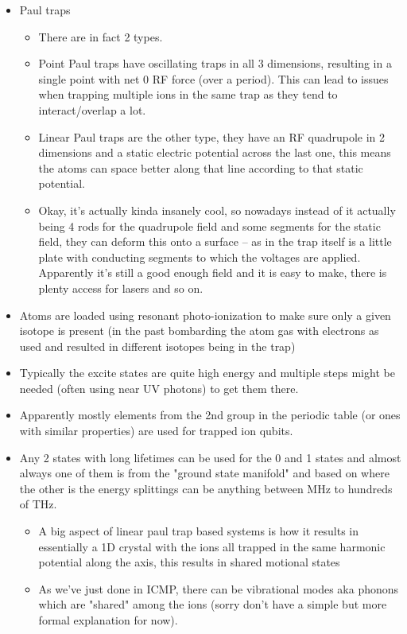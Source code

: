 \begin{itemize}
\begin{itemize}
    \item Paul traps
    \begin{itemize}
        \item There are in fact 2 types.
        \item Point Paul traps have oscillating traps in all 3 dimensions, resulting in a single point with net 0 RF force (over a period).
            This can lead to issues when trapping multiple ions in the same trap as they tend to interact/overlap a lot.
        \item Linear Paul traps are the other type, they have an RF quadrupole in 2 dimensions and a static electric potential across the last one, this means the atoms can space better along that line according to that static potential.
        \item Okay, it's actually kinda insanely cool, so nowadays instead of it actually being 4 rods for the quadrupole field and some segments for the static field, they can deform this onto a surface -- as in the trap itself is a little plate with conducting segments to which the voltages are applied.
            Apparently it's still a good enough field and it is easy to make, there is plenty access for lasers and so on.
    \end{itemize}
    \item Atoms are loaded using resonant photo-ionization to make sure only a given isotope is present (in the past bombarding the atom gas with electrons as used and resulted in different isotopes being in the trap)
    \item Typically the excite states are quite high energy and multiple steps might be needed (often using near UV photons) to get them there.
    \item Apparently mostly elements from the 2nd group in the periodic table (or ones with similar properties) are used for trapped ion qubits.
    \item Any 2 states with long lifetimes can be used for the 0 and 1 states and almost always one of them is from the "ground state manifold" and based on where the other is the energy splittings can be anything between MHz to hundreds of THz.
    \begin{itemize}
        \item A big aspect of linear paul trap based systems is how it results in essentially a 1D crystal with the ions all trapped in the same harmonic potential along the axis, this results in shared motional states
        \item As we've just done in ICMP, there can be vibrational modes aka phonons which are "shared" among the ions (sorry don't have a simple but more formal explanation for now).

\end{itemize}
\end{itemize}
\end{itemize}
